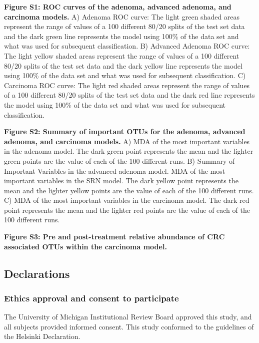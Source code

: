 \documentclass[12pt,]{article}
\begin{document}
\textbf{Figure S1: ROC curves of the adenoma, advanced adenoma, and
carcinoma models.} A) Adenoma ROC curve: The light green shaded areas
represent the range of values of a 100 different 80/20 splits of the
test set data and the dark green line represents the model using 100\%
of the data set and what was used for subsequent classification. B)
Advanced Adenoma ROC curve: The light yellow shaded areas represent the
range of values of a 100 different 80/20 splits of the test set data and
the dark yellow line represents the model using 100\% of the data set
and what was used for subsequent classification. C) Carcinoma ROC curve:
The light red shaded areas represent the range of values of a 100
different 80/20 splits of the test set data and the dark red line
represents the model using 100\% of the data set and what was used for
subsequent classification.

\textbf{Figure S2: Summary of important OTUs for the adenoma, advanced
adenoma, and carcinoma models.} A) MDA of the most important variables
in the adenoma model. The dark green point represents the mean and the
lighter green points are the value of each of the 100 different runs. B)
Summary of Important Variables in the advanced adenoma model. MDA of the
most important variables in the SRN model. The dark yellow point
represents the mean and the lighter yellow points are the value of each
of the 100 different runs. C) MDA of the most important variables in the
carcinoma model. The dark red point represents the mean and the lighter
red points are the value of each of the 100 different runs.

\textbf{Figure S3: Pre and post-treatment relative abundance of CRC
associated OTUs within the carcinoma model.}

\newpage

\subsection{Declarations}\label{declarations}

\subsubsection{Ethics approval and consent to
participate}\label{ethics-approval-and-consent-to-participate}

The University of Michigan Institutional Review Board approved this
study, and all subjects provided informed consent. This study conformed
to the guidelines of the Helsinki Declaration.
\end{document}
